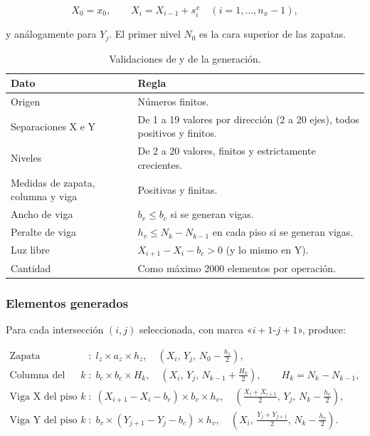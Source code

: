 \begin{equation}
	X_0 = x_0, \qquad X_i = X_{i-1} + s^{x}_{i} \quad (i = 1, \dots, n_x - 1),
\end{equation}

\noindent y análogamente para $Y_j$. El primer nivel $N_0$ es la cara superior de las zapatas.

\begin{table}[H]
	\centering
	\caption{Validaciones de  y de la generación.}
	\label{tab:mod-cuadricula-limites}
	\begin{tabular}{L{5.2cm}L{8.4cm}}
		\hline
		\textbf{Dato} & \textbf{Regla} \\ \hline
		Origen & Números finitos. \\
		Separaciones X e Y & De 1 a 19 valores por dirección (2 a 20 ejes), todos positivos y finitos. \\
		Niveles & De 2 a 20 valores, finitos y estrictamente crecientes. \\
		Medidas de zapata, columna y viga & Positivas y finitas. \\
		Ancho de viga & $b_v \le b_c$ si se generan vigas. \\
		Peralte de viga & $h_v \le N_k - N_{k-1}$ en cada piso si se generan vigas. \\
		Luz libre & $X_{i+1} - X_i - b_c > 0$ (y lo mismo en Y). \\
		Cantidad & Como máximo 2000 elementos por operación. \\
		\hline
	\end{tabular}
\end{table}

\subsubsection{Elementos generados}

Para cada intersección $(i, j)$ seleccionada, con marca «$i{+}1$-$j{+}1$»,  produce:

\begin{align}
	\text{Zapata} &: \; l_z \times a_z \times h_z, \quad (X_i,\, Y_j,\, N_0 - \tfrac{h_z}{2}), \\
	\text{Columna del piso } k &: \; b_c \times b_c \times H_k, \quad (X_i,\, Y_j,\, N_{k-1} + \tfrac{H_k}{2}),
	\qquad H_k = N_k - N_{k-1}, \\
	\text{Viga X del piso } k &: \; (X_{i+1} - X_i - b_c) \times b_v \times h_v, \quad
	\left(\tfrac{X_i + X_{i+1}}{2},\, Y_j,\, N_k - \tfrac{h_v}{2}\right), \\
	\text{Viga Y del piso } k &: \; b_v \times (Y_{j+1} - Y_j - b_c) \times h_v, \quad
	\left(X_i,\, \tfrac{Y_j + Y_{j+1}}{2},\, N_k - \tfrac{h_v}{2}\right).
\end{align}

